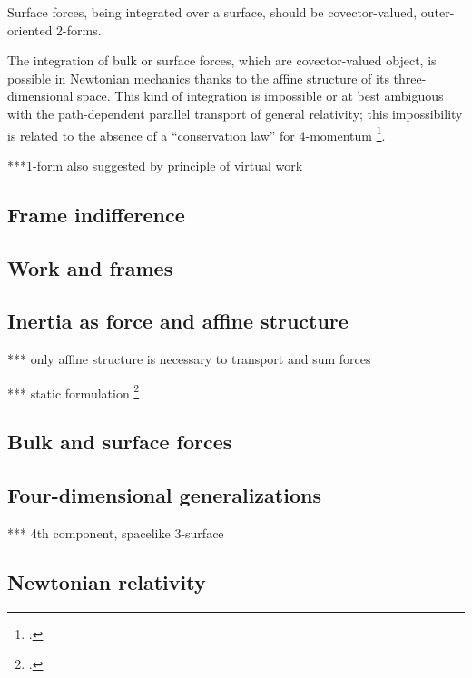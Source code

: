 \documentclass[\ifafour a4paper,12pt,\else a5paper,10pt,\fi%
onecolumn,oneside,article,%
british%
]{memoir}
\theoremstyle{remark}
\theoremstyle{innote}
\newcommand*{\citep}{\footcites}
\renewcommand*{\|}[1][]{\nonscript\,#1\vert\nonscript\;\mathopen{}}
\newcommand*{\sect}{\S}%
\newcommand*{\cf}{{cf.}}
\begin{document}
Surface forces, being integrated over a surface, should be covector-valued,
outer-oriented 2-forms.

The integration of bulk or surface forces, which are covector-valued
object, is possible in Newtonian mechanics thanks to the affine structure of
its three-dimensional space. This kind of integration is impossible or
at best ambiguous with the path-dependent parallel transport of general
relativity; this impossibility is related to the absence of a
\enquote{conservation law} for 4-momentum \citep[\sect~21]{pauli1921_t1958}[\sect~59]{eddington1923_r1930}[\sect~96]{landauetal1939_t1996}[also][]{aldermanetal1970}.


***1-form also suggested by principle of virtual work

\subsection{Frame indifference}
\label{sec:frame_indifference}


\subsection{Work and frames}
\label{sec:work_frames}


\subsection{Inertia as force and affine structure}
\label{sec:inertia_is_force}

*** only affine structure is necessary to transport and sum forces

*** static formulation  \citep[\cf][\sect~6, p.~652]{vandantzig1934d}

\subsection{Bulk and surface forces}
\label{sec:surface_forces}

\subsection{Four-dimensional generalizations}
\label{sec:4D_generalize}

*** 4th component, spacelike 3-surface


\subsection{Newtonian relativity}
\label{sec:newtonian_mechanics_aim}
\end{document}
